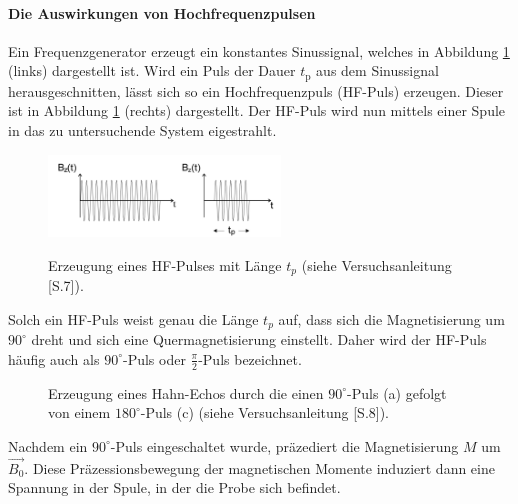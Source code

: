 \paragraph{Die Auswirkungen von Hochfrequenzpulsen}
Ein Frequenzgenerator erzeugt ein konstantes Sinussignal, welches in Abbildung \ref{fig:erz}
(links) dargestellt ist. Wird ein Puls der Dauer $t_{\text{p}}$ aus dem Sinussignal
herausgeschnitten, lässt sich so ein Hochfrequenzpuls (HF-Puls) erzeugen. Dieser
ist in Abbildung \ref{fig:erz} (rechts) dargestellt. Der HF-Puls wird nun mittels
einer Spule in das zu untersuchende System eigestrahlt.
\setcounter{figure}{3}
\begin{figure}[hbtp]
	\centering
	\vspace{-10pt}
	\caption{Erzeugung eines HF-Pulses mit L\"{a}nge $t_p$ (siehe Versuchsanleitung \cite{Anleitung}[S.7]).}
	\includegraphics[width=0.55\textwidth]{Plots/HFPuls.png}
	\label{fig:erz}
\end{figure}
Solch ein HF-Puls weist genau die L\"{a}nge $t_p$ auf, dass sich die Magnetisierung um $90^{\circ}$ dreht und sich eine Quermagnetisierung einstellt.
Daher wird der HF-Puls h\"{a}ufig auch als $90^{\circ}$-Puls oder $\frac{\pi}{2}$-Puls bezeichnet.
\begin{figure}
	\vspace{-5pt}
	\centering
	\caption{Erzeugung eines Hahn-Echos durch die einen $90^{\circ}$-Puls (a) gefolgt von einem $180^{\circ}$-Puls (c) (siehe Versuchsanleitung \cite{Anleitung}[S.8]).}
	\label{HahnEcho}
\end{figure}
Nachdem ein $90^{\circ}$-Puls eingeschaltet wurde, pr\"{a}zediert die Magneti{\-}sie{\-}rung $M$ um $\overrightarrow{B_0}$.
Diese Pr\"{a}zessionsbewe{\-}gung der magnetischen Momente induziert dann eine Spannung in der Spule, in der die Probe sich befindet.
